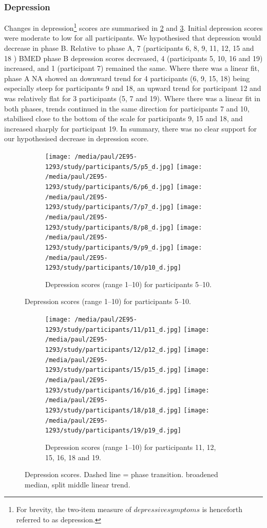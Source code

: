 \documentclass[man,floatsintext,a4paper,biblatex]{apa6}\usepackage[]{graphicx}\usepackage[]{color}
\newcommand\strokeA{\tikz[baseline=-.5ex]{ \draw[black,thick,align=center] (0,0) -- (2ex,0); }}
\newcommand\strokeB{\tikz[baseline=-.5ex]{ \draw[red,thick,dotted] (0,0) -- (2ex,0); }}
\begin{document}
\clearpage
\subsubsection{Depression}

Changes in depression\footnote{For brevity, the two-item measure of
${depressive symptoms}$ is henceforth referred to as depression.} scores
are summarised in \cref{fig:va-d-a} and \cref{fig:va-d-b}. Initial
depression scores were moderate to low for all participants. We
hypothesised that depression would decrease in phase B. Relative to phase
A, 7 (participants 6, 8, 9, 11, 12, 15 and 18 ) BMED phase B depression
scores decreased, 4 (participants 5, 10, 16 and 19) increased, and 1
(participant 7) remained the same.  Where there was a linear fit,
phase A NA showed an downward trend for 4 participants (6, 9, 15, 18)
being especially steep for participants 9 and 18, an upward trend for
participant 12 and was relatively flat for 3 participants (5, 7 and
19). Where there was a linear fit in both phases, trends continued
in the same direction for participants 7 and 10, stabilised close to
the bottom of the scale for participants 9, 15 and 18, and increased
sharply for participant 19. In summary, there was no clear support for
our hypothesised decrease in depression score.

\begin{figure}[!htbp]
  \begin{subfigure}[!htbp]{\textwidth}
    \texttt{[image: /media/paul/2E95-1293/study/participants/5/p5\_d.jpg]}
    \texttt{[image: /media/paul/2E95-1293/study/participants/6/p6\_d.jpg]}
    \texttt{[image: /media/paul/2E95-1293/study/participants/7/p7\_d.jpg]}
    \texttt{[image: /media/paul/2E95-1293/study/participants/8/p8\_d.jpg]}
    \texttt{[image: /media/paul/2E95-1293/study/participants/9/p9\_d.jpg]}
    \texttt{[image: /media/paul/2E95-1293/study/participants/10/p10\_d.jpg]}
    \caption{Depression scores (range 1--10) for participants 5--10.}
    \label{fig:va-d-a}
  \end{subfigure}
\end{figure}

\begin{figure}
\ContinuedFloat
  \begin{subfigure}[!htbp]{\textwidth}
    \texttt{[image: /media/paul/2E95-1293/study/participants/11/p11\_d.jpg]}
    \texttt{[image: /media/paul/2E95-1293/study/participants/12/p12\_d.jpg]}
    \texttt{[image: /media/paul/2E95-1293/study/participants/15/p15\_d.jpg]}
    \texttt{[image: /media/paul/2E95-1293/study/participants/16/p16\_d.jpg]}
    \texttt{[image: /media/paul/2E95-1293/study/participants/18/p18\_d.jpg]}
    \texttt{[image: /media/paul/2E95-1293/study/participants/19/p19\_d.jpg]}
    \caption{Depression scores (range 1--10) for participants 11, 12, 15, 16, 18 and 19.}
    \label{fig:va-d-b}
  \end{subfigure}
\caption{Depression scores. Dashed line = phase transition. \protect\strokeA{} broadened
median, \protect\strokeB{} split middle linear trend.}
\label{fig:d}
\end{figure}
\end{document}
